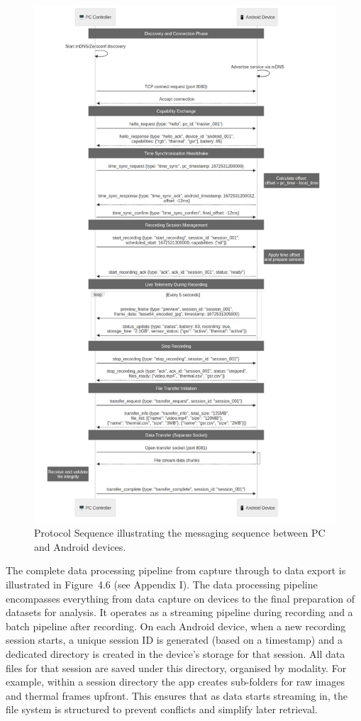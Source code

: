 \begin{figure}[htbp]
    \centering
    \includegraphics[width=\textwidth]{../../diagrams/fig_4_05_protocol_sequence.png}
    \caption{Protocol Sequence illustrating the messaging sequence between PC and Android devices.}
    \label{fig:4_05_protocol_sequence}
\end{figure}

The complete data processing pipeline from capture through to data export is illustrated in Figure~4.6 (see Appendix I). The data processing pipeline encompasses everything from data capture on devices to the final preparation of datasets for analysis. It operates as a streaming pipeline during recording and a batch pipeline after recording. On each Android device, when a new recording session starts, a unique session ID is generated (based on a timestamp) and a dedicated directory is created in the device's storage for that session. All data files for that session are saved under this directory, organised by modality. For example, within a session directory the app creates sub-folders for raw images and thermal frames upfront. This ensures that as data starts streaming in, the file system is structured to prevent conflicts and simplify later retrieval.


